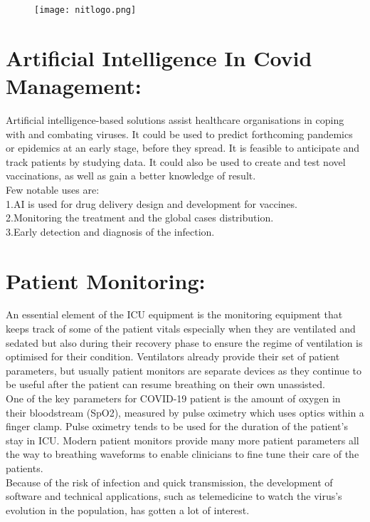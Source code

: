\documentclass[a4paper,12pt]{article}
\author{Aashutosh Patel \\ Roll no- 21111001}
\begin{document}
	\begin{figure}
		\centering
		\texttt{[image: nitlogo.png]}
	\end{figure}


	\section{Artificial Intelligence In Covid Management:}
	Artificial intelligence-based solutions assist healthcare organisations in
	coping with and combating viruses. It could be used to predict
	forthcoming pandemics or epidemics at an early stage, before they spread.
	It is feasible to anticipate and track patients by studying data. It could
	also be used to create and test novel vaccinations, as well as gain a better
	knowledge of result.
	\\
	Few notable uses are:
	\\
 1.AI is used for drug delivery design and development for vaccines.
\\
2.Monitoring the treatment and the global cases distribution.
\\
3.Early detection and diagnosis of the infection.

\section{Patient Monitoring:}
An essential element of the ICU equipment is the monitoring equipment that keeps
track of some of the patient vitals especially when they are ventilated and sedated
but also during their recovery phase to ensure the regime of ventilation is optimised
for their condition. Ventilators already provide their set of patient parameters, but
usually patient monitors are separate devices as they continue to be useful after the
patient can resume breathing on their own unassisted.
\\
 One of the key parameters for
COVID-19 patient is the amount of oxygen in their bloodstream (SpO2), measured
by pulse oximetry which uses optics within a finger clamp. Pulse oximetry tends
to be used for the duration of the patient’s stay in ICU. Modern patient monitors
provide many more patient parameters all the way to breathing waveforms to enable
clinicians to fine tune their care of the patients.
\\
Because of the risk of infection and quick transmission, the development
of software and technical applications, such as telemedicine to watch the
virus’s evolution in the population, has gotten a lot of interest.
\end{document}
